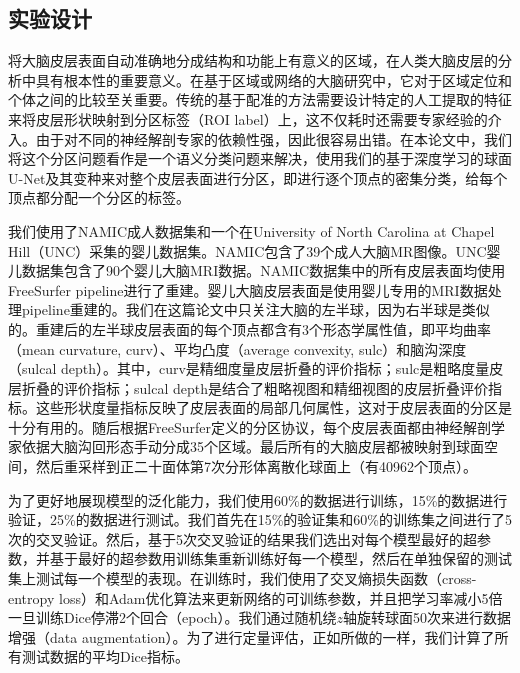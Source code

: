 \subsection{实验设计}\label{sec:大脑皮层分区实验实验设计}
将大脑皮层表面自动准确地分成结构和功能上有意义的区域，在人类大脑皮层的分析中具有根本性的重要意义\cite{meng2015automatic}。在基于区域或网络的大脑研究中，它对于区域定位和个体之间的比较至关重要。传统的基于配准的方法\cite{meng2015automatic,yeo2009spherical,fischl2004automatically}需要设计特定的人工提取的特征来将皮层形状映射到分区标签（ROI label）上，这不仅耗时还需要专家经验的介入。由于对不同的神经解剖专家的依赖性强，因此很容易出错。在本论文中，我们将这个分区问题看作是一个语义分类问题来解决，使用我们的基于深度学习的球面U-Net及其变种来对整个皮层表面进行分区，即进行逐个顶点的密集分类，给每个顶点都分配一个分区的标签。

我们使用了NAMIC成人数据集\cite{meng2015automatic}和一个在University of North Carolina at Chapel Hill（UNC）采集的婴儿数据集。NAMIC包含了39个成人大脑MR图像。UNC婴儿数据集包含了90个婴儿大脑MRI数据。NAMIC数据集中的所有皮层表面均使用FreeSurfer\cite{fischl2012freesurfer}  pipeline进行了重建。婴儿大脑皮层表面是使用婴儿专用的MRI数据处理pipeline\cite{li2015construction,2014measuring}重建的。我们在这篇论文中只关注大脑的左半球，因为右半球是类似的。重建后的左半球皮层表面的每个顶点都含有3个形态学属性值，即平均曲率（mean curvature, curv）、平均凸度（average convexity, sulc）和脑沟深度（sulcal depth）。其中，curv是精细度量皮层折叠的评价指标；sulc是粗略度量皮层折叠的评价指标；sulcal depth是结合了粗略视图和精细视图的皮层折叠评价指标。这些形状度量指标反映了皮层表面的局部几何属性，这对于皮层表面的分区是十分有用的\cite{desikan2006automated}。随后根据FreeSurfer定义的分区协议\cite{desikan2006automated}，每个皮层表面都由神经解剖学家依据大脑沟回形态手动分成35个区域。最后所有的大脑皮层都被映射到球面空间，然后重采样到正二十面体第7次分形体离散化球面上（有40962个顶点）。

为了更好地展现模型的泛化能力，我们使用60\%的数据进行训练，15\%的数据进行验证，25\%的数据进行测试。我们首先在15\%的验证集和60\%的训练集之间进行了5次的交叉验证。然后，基于5次交叉验证的结果我们选出对每个模型最好的超参数，并基于最好的超参数用训练集重新训练好每一个模型，然后在单独保留的测试集上测试每一个模型的表现。在训练时，我们使用了交叉熵损失函数（cross-entropy loss）和Adam优化算法\cite{kingma2014adam}来更新网络的可训练参数，并且把学习率减小5倍一旦训练Dice停滞2个回合（epoch）。我们通过随机绕$z$轴旋转球面50次来进行数据增强（data augmentation）。为了进行定量评估，正如\cite{yeo2009spherical}所做的一样，我们计算了所有测试数据的平均Dice指标。


